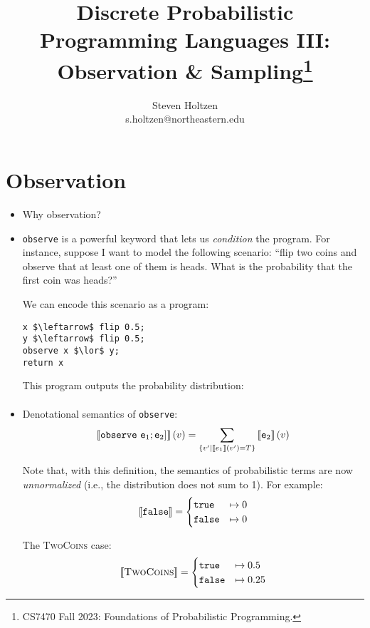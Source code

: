 \documentclass{tufte-handout}
\title{Discrete Probabilistic Programming Languages III: Observation \& Sampling\thanks{CS7470 Fall 2023: Foundations of Probabilistic Programming.}}
\author[]{Steven Holtzen\\s.holtzen@northeastern.edu}
\begin{document}
\maketitle%

\section{Observation}
\begin{itemize}
  \item Why observation? 
  \item \texttt{observe} is a powerful keyword that lets us \emph{condition} the
program. For instance, suppose I want to model the following scenario: ``flip 
two coins and observe that at least one of them is heads. What is the probability 
that the first coin was heads?''

We can encode this scenario as a \disc{} program:

\begin{lstlisting}[mathescape=true, caption={\textsc{TwoCoins}}]
x $\leftarrow$ flip 0.5; 
y $\leftarrow$ flip 0.5;
observe x $\lor$ y;
return x
\end{lstlisting}

This program outputs the probability distribution:
\begin{align*}
  [\true \mapsto (0.25 + 0.25) / 0.75, \false
\mapsto 0.25 / 0.75]
\end{align*} 

\item Denotational semantics of \texttt{observe}:
  \begin{align*}
  \left \llbracket {\texttt{observe}~\texttt{e}_1; \texttt{e}_2]} \right \rrbracket(v) = 
  \sum_{\{v' \mid \left \llbracket {e_1} \right \rrbracket(v') = T\}} \left \llbracket {\texttt{e}_2} \right \rrbracket(v)
  \end{align*}

  Note that, with this definition, the semantics of probabilistic terms are now
  \emph{unnormalized} (i.e., the distribution does not sum to 1). For example:
  \begin{align*}
    \left \llbracket {\texttt{false}} \right \rrbracket = \begin{cases}
      \texttt{true} &\mapsto 0 \\ 
      \texttt{false} &\mapsto 0
    \end{cases}
  \end{align*}

  The \textsc{TwoCoins} case:
  \begin{align*}
    \left \llbracket {\textsc{TwoCoins}} \right \rrbracket = \begin{cases}
      \texttt{true} &\mapsto 0.5 \\ 
      \texttt{false} &\mapsto 0.25
    \end{cases}
  \end{align*}
  


\end{itemize}
\end{document}
